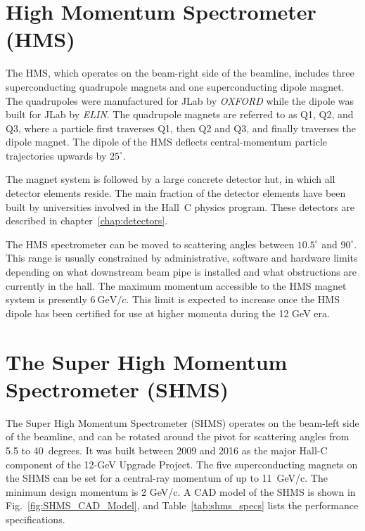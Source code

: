 {%

\section{High Momentum Spectrometer (HMS) }

The HMS, which operates on the beam-right side of the beamline, 
includes three superconducting quadrupole magnets and one superconducting dipole magnet. The quadrupoles were
manufactured for JLab by {\em OXFORD} while the dipole was built for
JLab by {\em ELIN}.  The quadrupole magnets are referred to as Q1, Q2,
and Q3, where a particle first traverses Q1, then Q2 and Q3, and
finally traverses the dipole magnet. The dipole of the HMS deflects central-momentum
particle trajectories upwards by $25^{\circ}$.


The magnet system is followed by a large concrete detector hut, in which all
detector elements reside. The main fraction of the detector elements have been
built by universities involved in the Hall~C physics program.  These
detectors are described in chapter~\ref{chap:detectors}.

The HMS spectrometer can be moved to scattering angles between
$10.5^{\circ}$ and $90^{\circ}$. This range is usually constrained by
administrative, software and hardware limits depending on what
downstream beam pipe is installed and what obstructions are currently in the hall.  The
maximum momentum accessible to the HMS magnet
system is presently $6~\textrm{GeV}/c$. This limit is expected to increase
once the HMS dipole has been certified for use at higher momenta during 
the 12 GeV era.

\section{The Super High Momentum Spectrometer (SHMS)}

The Super High Momentum Spectrometer (SHMS) operates on the beam-left
side of the beamline, and can be rotated around the pivot for scattering angles from 5.5
to 40~degrees. It was built between 2009 and 2016 as the major
Hall-C component of the 12-GeV Upgrade Project.  The five superconducting
magnets on the SHMS can be set for a central-ray momentum of up to 11~GeV/c.
The minimum design momentum is 2 GeV/c. A CAD model of the SHMS is shown
in Fig.~\ref{fig:SHMS_CAD_Model}, and Table~\ref{tab:shms_specs} lists the performance specifications. 

}
